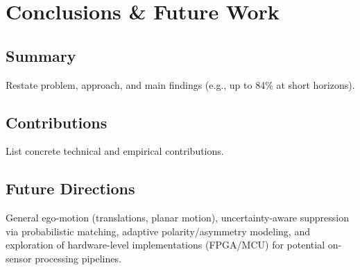 \chapter{Conclusions \& Future Work}\label{chap:conclusion}

\section{Summary}
Restate problem, approach, and main findings (e.g., up to 84\% at short horizons).

\section{Contributions}
List concrete technical and empirical contributions.

\section{Future Directions}
General ego-motion (translations, planar motion), uncertainty-aware suppression via probabilistic matching, adaptive polarity/asymmetry modeling, and exploration of hardware-level implementations (FPGA/MCU) for potential on-sensor processing pipelines.
